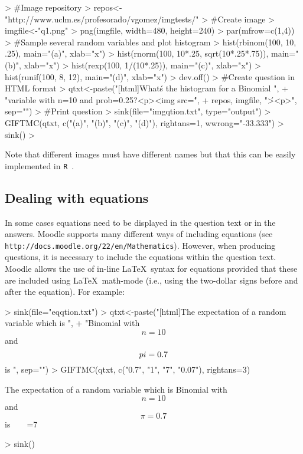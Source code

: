 \documentclass[a4paper]{article}
\newcommand{\RR}{\texttt{R}\ }
\begin{document}
\begin{Schunk}
\begin{Sinput}
> #Image repository
> repos<-"http://www.uclm.es/profesorado/vgomez/imgtests/"
> #Create image
> imgfile<-"q1.png"
> png(imgfile, width=480, height=240)
> par(mfrow=c(1,4))
> #Sample several random variables and plot histogram
> hist(rbinom(100, 10, .25), main="(a)", xlab="x")
> hist(rnorm(100, 10*.25, sqrt(10*.25*.75)), main="(b)", xlab="x")
> hist(rexp(100, 1/(10*.25)), main="(c)", xlab="x")
> hist(runif(100, 8, 12), main="(d)", xlab="x")
> dev.off()
> #Create question in HTML format
> qtxt<-paste("[html]What\'s the histogram for a Binomial ",
+    "variable with n=10 and prob=0.25?\n<p>\n<img src=\'", 
+    repos, imgfile, "\'>\n<p>", sep="")
> #Print question
> sink(file="imgqtion.txt", type="output")
> GIFTMC(qtxt, c("(a)", "(b)", "(c)", "(d)"), rightans=1, wwrong="-33.333")
> sink()
> 
\end{Sinput}
\end{Schunk}
\noindent
Note that different images must have different names but that this can
be easily implemented in \RR.



\subsection{Dealing with equations}

In some cases equations need to be displayed in the question text or in the answers.
Moodle supports many different ways of including equations (see 
\verb+http://docs.moodle.org/22/en/Mathematics+). However, when producing
questions, it is necessary to include the equations within the question text.
Moodle allows the use of in-line \LaTeX\ syntax for equations provided that
these are included using \LaTeX\ math-mode (i.e., using the two-dollar signs
before and after the equation). For example:


\begin{Schunk}
\begin{Sinput}
> sink(file="eqqtion.txt")
> qtxt<-paste("[html]The expectation of a random variable which is \n",
+    "Binomial with $$n=10$$ and $$\\pi=0.7$$ is ", sep="")
> GIFTMC(qtxt, c("0.7", "1", "7", "0.07"), rightans=3)
\end{Sinput}
\begin{Soutput}
[html]The expectation of a random variable which is 
Binomial with $$n=10$$ and $$\pi=0.7$$ is 
{
~%0%0.7
~%0%1
=7
~%0%0.07
}
\end{Soutput}
\begin{Sinput}
> sink()
\end{Sinput}
\end{Schunk}
\end{document}
